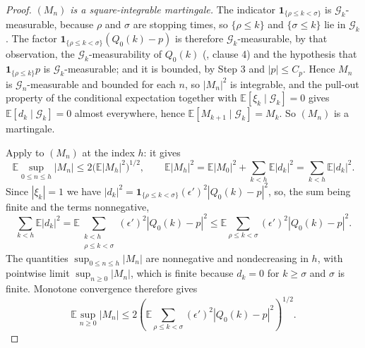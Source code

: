 \begin{proof}
\emph{$(M_n)$ is a square-integrable martingale.} The indicator
$\mathbf1_{\{\rho\le k<\sigma\}}$ is $\mathcal G_k$-measurable, because $\rho$
and $\sigma$ are stopping times, so $\{\rho\le k\}$ and $\{\sigma\le k\}$ lie in
$\mathcal G_k$. The factor $\mathbf1_{\{\rho\le k<\sigma\}}(Q_0(k)-p)$ is
therefore $\mathcal G_k$-measurable, by that observation, the
$\mathcal G_k$-measurability of $Q_0(k)$ (, clause 4) and
the hypothesis that $\mathbf1_{\{\rho\le k\}}p$ is $\mathcal G_k$-measurable;
and it is bounded, by Step 3 and $|p|\le C_p$. Hence $M_n$ is
$\mathcal G_n$-measurable and bounded for each $n$, so $|M_n|^2$ is integrable,
and the pull-out property of the conditional expectation together with
$\mathbb E[\xi_k\mid\mathcal G_k]=0$ gives
$\mathbb E[d_k\mid\mathcal G_k]=0$ almost everywhere, hence
$\mathbb E[M_{k+1}\mid\mathcal G_k]=M_k$. So $(M_n)$ is a martingale.

Apply  to $(M_n)$ at the index $h$: it gives
\[
  \mathbb E\sup_{0\le n\le h}|M_n|\le2\bigl(\mathbb E|M_h|^2\bigr)^{1/2},
  \qquad
  \mathbb E|M_h|^2=\mathbb E|M_0|^2+\sum_{k<h}\mathbb E|d_k|^2
   =\sum_{k<h}\mathbb E|d_k|^2 .
\]
Since $|\xi_k|=1$ we have
$|d_k|^2=\mathbf1_{\{\rho\le k<\sigma\}}(\epsilon')^2|Q_0(k)-p|^2$, so, the sum
being finite and the terms nonnegative,
\[
  \sum_{k<h}\mathbb E|d_k|^2
   =\mathbb E\sum_{\substack{k<h\\ \rho\le k<\sigma}}
       (\epsilon')^2|Q_0(k)-p|^2
   \le\mathbb E\sum_{\rho\le k<\sigma}(\epsilon')^2|Q_0(k)-p|^2 .
\]
The quantities $\sup_{0\le n\le h}|M_n|$ are nonnegative and nondecreasing in
$h$, with pointwise limit $\sup_{n\ge0}|M_n|$, which is finite because $d_k=0$
for $k\ge\sigma$ and $\sigma$ is finite. Monotone convergence therefore gives
\begin{equation}\label{eq:swt-doob}
  \mathbb E\sup_{n\ge0}|M_n|
   \le2\left(\mathbb E\sum_{\rho\le k<\sigma}
        (\epsilon')^2|Q_0(k)-p|^2\right)^{1/2}.
\end{equation}


\end{proof}
